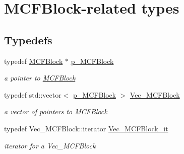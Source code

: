 \hypertarget{group___m_c_f_block___t_y_p_e_s}{}\section{M\+C\+F\+Block-\/related types}
\label{group___m_c_f_block___t_y_p_e_s}
\subsection*{Typedefs}
\begin{DoxyCompactItemize}
\item 
\mbox{\label{group___m_c_f_block___t_y_p_e_s_gadd093efb785d0de13da72a397653b760}} 
typedef \mbox{\hyperlink{class_s_m_spp__di__unipi__it_1_1_m_c_f_block}{M\+C\+F\+Block}} $\ast$ \mbox{\hyperlink{group___m_c_f_block___t_y_p_e_s_gadd093efb785d0de13da72a397653b760}{p\+\_\+\+M\+C\+F\+Block}}
\begin{DoxyCompactList}\small\item\em a pointer to \mbox{\hyperlink{class_s_m_spp__di__unipi__it_1_1_m_c_f_block}{M\+C\+F\+Block}} \end{DoxyCompactList}\item 
\mbox{\label{group___m_c_f_block___t_y_p_e_s_ga7908bbe51ed80987fa3c35ab2ecb1eb7}} 
typedef std\+::vector$<$ \mbox{\hyperlink{group___m_c_f_block___t_y_p_e_s_gadd093efb785d0de13da72a397653b760}{p\+\_\+\+M\+C\+F\+Block}} $>$ \mbox{\hyperlink{group___m_c_f_block___t_y_p_e_s_ga7908bbe51ed80987fa3c35ab2ecb1eb7}{Vec\+\_\+\+M\+C\+F\+Block}}
\begin{DoxyCompactList}\small\item\em a vector of pointers to \mbox{\hyperlink{class_s_m_spp__di__unipi__it_1_1_m_c_f_block}{M\+C\+F\+Block}} \end{DoxyCompactList}\item 
\mbox{\label{group___m_c_f_block___t_y_p_e_s_gad2e511b38af95db398828a279337a270}} 
typedef Vec\+\_\+\+M\+C\+F\+Block\+::iterator \mbox{\hyperlink{group___m_c_f_block___t_y_p_e_s_gad2e511b38af95db398828a279337a270}{Vec\+\_\+\+M\+C\+F\+Block\+\_\+it}}
\begin{DoxyCompactList}\small\item\em iterator for a Vec\+\_\+\+M\+C\+F\+Block \end{DoxyCompactList}\item 

\end{DoxyCompactItemize}
